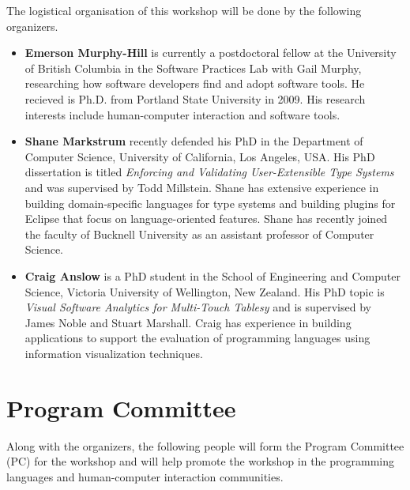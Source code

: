 \documentclass{sigplanconf}
\begin{document}
The logistical organisation of this workshop will be done by the following organizers.

\begin{itemize}
\item \textbf{Emerson Murphy-Hill} is currently a
  postdoctoral fellow at the University of British Columbia in the
  Software Practices Lab with Gail Murphy, researching how 
  software developers find and adopt software tools.
  He recieved is Ph.D. from Portland State University in 2009.
  His research interests include human-computer interaction and software tools. 

\item \textbf{Shane Markstrum} recently defended his PhD in the
  Department of Computer Science, University of California, Los
  Angeles, USA. His PhD dissertation is titled \emph{Enforcing and
    Validating User-Extensible Type Systems} and was supervised by
  Todd Millstein. Shane has extensive experience in building
  domain-specific languages for type systems and building plugins for
  Eclipse that focus on language-oriented features. Shane has recently
  joined the faculty of Bucknell University as an assistant professor
  of Computer Science.  
  
\item \textbf{Craig Anslow} is a PhD student in the School of
  Engineering and Computer Science, Victoria University of Wellington,
  New Zealand. His PhD topic is \emph{Visual Software Analytics for
   Multi-Touch Tablesy} and is supervised by James Noble and
  Stuart Marshall. Craig has experience in building applications to
  support the evaluation of programming languages using information
  visualization techniques.

\end{itemize}

\section{Program Committee}

Along with the organizers, the following people will form the Program
Committee (PC) for the workshop and will help promote the workshop in
the programming languages and human-computer interaction communities.
\end{document}
